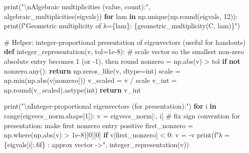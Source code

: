 \documentclass[
  letterpaper,
  DIV=11,
  numbers=noendperiod]{scrreprt}
\newenvironment{Shaded}{\begin{snugshade}}{\end{snugshade}}
\newcommand{\BuiltInTok}[1]{\textcolor[rgb]{0.00,0.23,0.31}{#1}}
\newcommand{\CharTok}[1]{\textcolor[rgb]{0.13,0.47,0.30}{#1}}
\newcommand{\CommentTok}[1]{\textcolor[rgb]{0.37,0.37,0.37}{#1}}
\newcommand{\ControlFlowTok}[1]{\textcolor[rgb]{0.00,0.23,0.31}{\textbf{#1}}}
\newcommand{\DecValTok}[1]{\textcolor[rgb]{0.68,0.00,0.00}{#1}}
\newcommand{\FloatTok}[1]{\textcolor[rgb]{0.68,0.00,0.00}{#1}}
\newcommand{\KeywordTok}[1]{\textcolor[rgb]{0.00,0.23,0.31}{\textbf{#1}}}
\newcommand{\NormalTok}[1]{\textcolor[rgb]{0.00,0.23,0.31}{#1}}
\newcommand{\OperatorTok}[1]{\textcolor[rgb]{0.37,0.37,0.37}{#1}}
\newcommand{\SpecialCharTok}[1]{\textcolor[rgb]{0.37,0.37,0.37}{#1}}
\newcommand{\SpecialStringTok}[1]{\textcolor[rgb]{0.13,0.47,0.30}{#1}}
\newcommand{\StringTok}[1]{\textcolor[rgb]{0.13,0.47,0.30}{#1}}
\begin{document}
\begin{Shaded}
\begin{Highlighting}[]
\BuiltInTok{print}\NormalTok{(}\StringTok{"}\CharTok{\textbackslash{}n}\StringTok{Algebraic multiplicities (value, count):"}\NormalTok{, algebraic\_multiplicities(eigvals))}
\ControlFlowTok{for}\NormalTok{ lam }\KeywordTok{in}\NormalTok{ np.unique(np.}\BuiltInTok{round}\NormalTok{(eigvals, }\DecValTok{12}\NormalTok{)):}
    \BuiltInTok{print}\NormalTok{(}\SpecialStringTok{f"Geometric multiplicity of λ=}\SpecialCharTok{\{}\NormalTok{lam}\SpecialCharTok{\}}\SpecialStringTok{: }\SpecialCharTok{\{}\NormalTok{geometric\_multiplicity(C, lam)}\SpecialCharTok{\}}\SpecialStringTok{"}\NormalTok{)}

\CommentTok{\# Helper: integer{-}proportional presentation of eigenvectors (useful for handouts)}
\KeywordTok{def}\NormalTok{ integer\_representation(v, tol}\OperatorTok{=}\FloatTok{1e{-}8}\NormalTok{):}
    \CommentTok{\# scale vector so the smallest non{-}zero absolute entry becomes 1 (or {-}1), then round}
\NormalTok{    nonzero }\OperatorTok{=}\NormalTok{ np.}\BuiltInTok{abs}\NormalTok{(v) }\OperatorTok{\textgreater{}}\NormalTok{ tol}
    \ControlFlowTok{if} \KeywordTok{not}\NormalTok{ nonzero.}\BuiltInTok{any}\NormalTok{():}
        \ControlFlowTok{return}\NormalTok{ np.zeros\_like(v, dtype}\OperatorTok{=}\BuiltInTok{int}\NormalTok{)}
\NormalTok{    scale }\OperatorTok{=}\NormalTok{ np.}\BuiltInTok{min}\NormalTok{(np.}\BuiltInTok{abs}\NormalTok{(v[nonzero]))}
\NormalTok{    v\_scaled }\OperatorTok{=}\NormalTok{ v }\OperatorTok{/}\NormalTok{ scale}
\NormalTok{    v\_int }\OperatorTok{=}\NormalTok{ np.}\BuiltInTok{round}\NormalTok{(v\_scaled).astype(}\BuiltInTok{int}\NormalTok{)}
    \ControlFlowTok{return}\NormalTok{ v\_int}

\BuiltInTok{print}\NormalTok{(}\StringTok{"}\CharTok{\textbackslash{}n}\StringTok{Integer{-}proportional eigenvectors (for presentation):"}\NormalTok{)}
\ControlFlowTok{for}\NormalTok{ i }\KeywordTok{in} \BuiltInTok{range}\NormalTok{(eigvecs\_norm.shape[}\DecValTok{1}\NormalTok{]):}
\NormalTok{    v }\OperatorTok{=}\NormalTok{ eigvecs\_norm[:, i]}
    \CommentTok{\# fix sign convention for presentation: make first nonzero entry positive}
\NormalTok{    first\_nonzero }\OperatorTok{=}\NormalTok{ np.where(np.}\BuiltInTok{abs}\NormalTok{(v) }\OperatorTok{\textgreater{}} \FloatTok{1e{-}8}\NormalTok{)[}\DecValTok{0}\NormalTok{][}\DecValTok{0}\NormalTok{]}
    \ControlFlowTok{if}\NormalTok{ v[first\_nonzero] }\OperatorTok{\textless{}} \DecValTok{0}\NormalTok{:}
\NormalTok{        v }\OperatorTok{=} \OperatorTok{{-}}\NormalTok{v}
    \BuiltInTok{print}\NormalTok{(}\SpecialStringTok{f"λ = }\SpecialCharTok{\{}\NormalTok{eigvals[i]}\SpecialCharTok{:.6f\}}\SpecialStringTok{ : approx vector {-}\textgreater{}"}\NormalTok{, integer\_representation(v))}
\end{Highlighting}
\end{Shaded}
\end{document}
